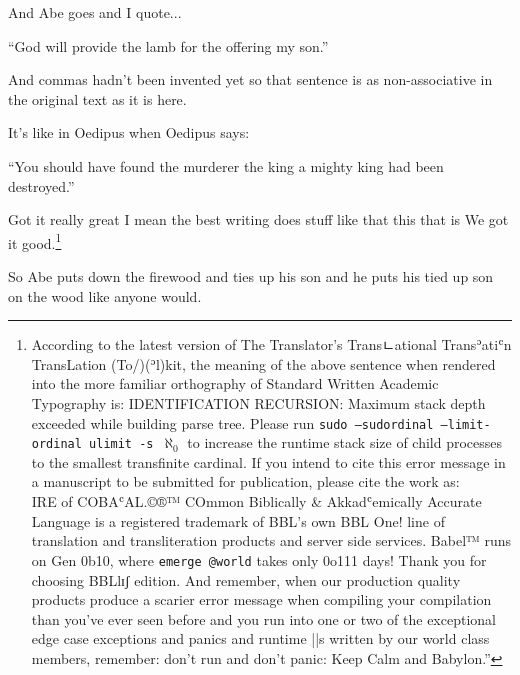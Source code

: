 {
}
{
}
{


	And Abe goes and I quote...

	``God will provide the lamb for the offering my son.''

	And commas hadn't been invented yet so that sentence is as non-associative in the original text as it is here.

	It's like in Oedipus when Oedipus says:

	``You should have found the murderer the king a mighty king had been destroyed.''

	Got it really great I mean the best writing does stuff like that this that is We got it good.\footnote{According to the latest version of The Translator's Transㄴational Transʾatiʿn TransLation (To/)(ʾl)kit, the meaning of the above sentence when rendered into the more familiar orthography of Standard Written Academic Typography is: IDENTIFICATION RECURSION: Maximum stack depth exceeded while building parse tree. Please run \texttt{sudo --sudordinal --limit-ordinal ulimit -s }$\aleph_0$ to increase the runtime stack size of child processes to the smallest transfinite cardinal. If you intend to cite this error message in a manuscript to be submitted for publication, please cite the work as:\\IRE of COBAʿAL.©®™ COmmon Biblically \& Akkadʿemically Accurate Language is a registered trademark of BBL's own BBL One! line of translation and transliteration products and server side services. Babel™ runs on Gen 0b10, where \texttt{emerge @world} takes only 0o111 days! Thank you for choosing BBLlɪʃ edition. And remember, when our production quality products produce a scarier error message when compiling your compilation than you've ever seen before and you run into one or two of the exceptional edge case exceptions and panics and runtime ||s written by our world class members, remember: don't run and don't panic: Keep Calm and Babylon.''}
}

{
}
{
}
{


	So Abe puts down the firewood and ties up his son and he puts his tied up son on the wood like anyone would.
}


